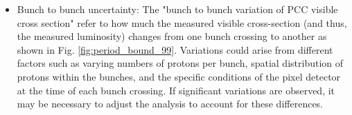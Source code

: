 \begin{itemize}
\begin{itemize}

\end{itemize}


\item Bunch to bunch uncertainty: The "bunch to bunch variation of PCC visible cross section" refer to how much the measured visible cross-section (and thus, the measured luminosity) changes from one bunch crossing to another as shown in Fig. \ref{fig:period_bound_99}. Variations could arise from different factors such as varying numbers of protons per bunch, spatial distribution of protons within the bunches, and the specific conditions of the pixel detector at the time of each bunch crossing. %
If significant variations are observed, it may be necessary to adjust the analysis to account for these differences. 


\end{itemize}
